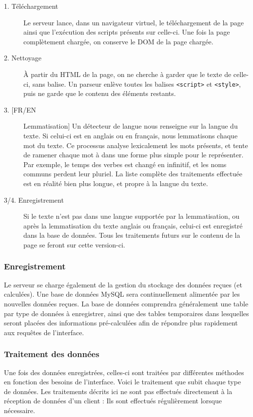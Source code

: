 				\begin{description}
					\item[1. Téléchargement] Le serveur lance, dans un navigateur virtuel, le téléchargement de la page ainsi que l'exécution des scripts présents sur celle-ci. Une fois la page complètement chargée, on conserve le DOM de la page chargée.
					\item[2. Nettoyage] À partir du HTML de la page, on ne cherche à garder que le texte de celle-ci, sans balise. Un parseur enlève toutes les balises \texttt{<script>} et \texttt{<style>}, puis ne garde que le contenu des éléments restants.
					\item[3. [FR/EN] Lemmatisation] Un détecteur de langue nous renseigne sur la langue du texte. Si celui-ci est en anglais ou en français, nous lemmatisons chaque mot du texte. Ce processus analyse lexicalement les mots présents, et tente de ramener chaque mot à dans une forme plus simple pour le représenter. Par exemple, le temps des verbes est changé en infinitif, et les noms communs perdent leur pluriel. La liste complète des traitements effectuée est en réalité bien plus longue, et propre à la langue du texte.
					\item[3/4. Enregistrement] Si le texte n'est pas dans une langue supportée par la lemmatisation, ou après la lemmatisation du texte anglais ou français, celui-ci est enregistré dans la base de données. Tous les traitements futurs sur le contenu de la page se feront sur cette version-ci.
				\end{description}

		\subsubsection{Enregistrement}

			Le serveur se charge également de la gestion du stockage des données reçues (et calculées). Une base de données MySQL sera continuellement alimentée par les nouvelles données reçues. La base de données comprendra généralement une table par type de données à enregistrer, ainsi que des tables temporaires dans lesquelles seront placées des informations pré-calculées afin de répondre plus rapidement aux requêtes de l'interface.

		\subsubsection{Traitement des données}

			Une fois des données enregistrées, celles-ci sont traitées par différentes méthodes en fonction des besoins de l'interface. Voici le traitement que subit chaque type de données. Les traitements décrits ici ne sont pas effectués directement à la réception de données d'un client : Ils sont effectués régulièrement lorsque nécessaire.

